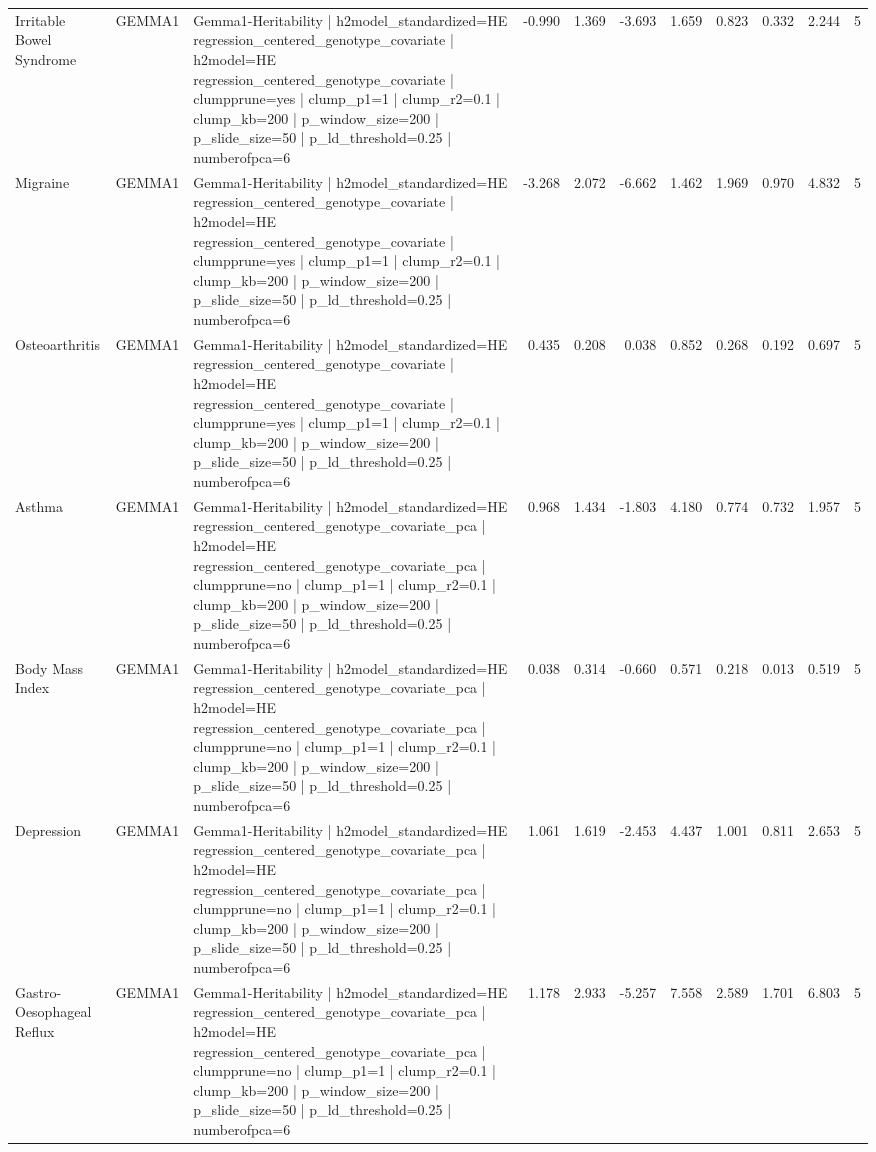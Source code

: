 \begin{landscape}
\begin{longtable}{p{2.4cm}p{1.8cm}p{6.0cm}rrrrrrrr}
Irritable Bowel Syndrome & GEMMA1 & Gemma1-Heritability | h2model\_standardized=HE regression\_centered\_genotype\_covariate | h2model=HE regression\_centered\_genotype\_covariate | clumpprune=yes | clump\_p1=1 | clump\_r2=0.1 | clump\_kb=200 | p\_window\_size=200 | p\_slide\_size=50 | p\_ld\_threshold=0.25 | numberofpca=6 & -0.990 & 1.369 & -3.693 & 1.659 & 0.823 & 0.332 & 2.244 & 5 \\
Migraine & GEMMA1 & Gemma1-Heritability | h2model\_standardized=HE regression\_centered\_genotype\_covariate | h2model=HE regression\_centered\_genotype\_covariate | clumpprune=yes | clump\_p1=1 | clump\_r2=0.1 | clump\_kb=200 | p\_window\_size=200 | p\_slide\_size=50 | p\_ld\_threshold=0.25 | numberofpca=6 & -3.268 & 2.072 & -6.662 & 1.462 & 1.969 & 0.970 & 4.832 & 5 \\
Osteoarthritis & GEMMA1 & Gemma1-Heritability | h2model\_standardized=HE regression\_centered\_genotype\_covariate | h2model=HE regression\_centered\_genotype\_covariate | clumpprune=yes | clump\_p1=1 | clump\_r2=0.1 | clump\_kb=200 | p\_window\_size=200 | p\_slide\_size=50 | p\_ld\_threshold=0.25 | numberofpca=6 & 0.435 & 0.208 & 0.038 & 0.852 & 0.268 & 0.192 & 0.697 & 5 \\
Asthma & GEMMA1 & Gemma1-Heritability | h2model\_standardized=HE regression\_centered\_genotype\_covariate\_pca | h2model=HE regression\_centered\_genotype\_covariate\_pca | clumpprune=no | clump\_p1=1 | clump\_r2=0.1 | clump\_kb=200 | p\_window\_size=200 | p\_slide\_size=50 | p\_ld\_threshold=0.25 | numberofpca=6 & 0.968 & 1.434 & -1.803 & 4.180 & 0.774 & 0.732 & 1.957 & 5 \\
Body Mass Index & GEMMA1 & Gemma1-Heritability | h2model\_standardized=HE regression\_centered\_genotype\_covariate\_pca | h2model=HE regression\_centered\_genotype\_covariate\_pca | clumpprune=no | clump\_p1=1 | clump\_r2=0.1 | clump\_kb=200 | p\_window\_size=200 | p\_slide\_size=50 | p\_ld\_threshold=0.25 | numberofpca=6 & 0.038 & 0.314 & -0.660 & 0.571 & 0.218 & 0.013 & 0.519 & 5 \\
Depression & GEMMA1 & Gemma1-Heritability | h2model\_standardized=HE regression\_centered\_genotype\_covariate\_pca | h2model=HE regression\_centered\_genotype\_covariate\_pca | clumpprune=no | clump\_p1=1 | clump\_r2=0.1 | clump\_kb=200 | p\_window\_size=200 | p\_slide\_size=50 | p\_ld\_threshold=0.25 | numberofpca=6 & 1.061 & 1.619 & -2.453 & 4.437 & 1.001 & 0.811 & 2.653 & 5 \\
Gastro-Oesophageal Reflux & GEMMA1 & Gemma1-Heritability | h2model\_standardized=HE regression\_centered\_genotype\_covariate\_pca | h2model=HE regression\_centered\_genotype\_covariate\_pca | clumpprune=no | clump\_p1=1 | clump\_r2=0.1 | clump\_kb=200 | p\_window\_size=200 | p\_slide\_size=50 | p\_ld\_threshold=0.25 | numberofpca=6 & 1.178 & 2.933 & -5.257 & 7.558 & 2.589 & 1.701 & 6.803 & 5 \\

\end{longtable}
\end{landscape}
